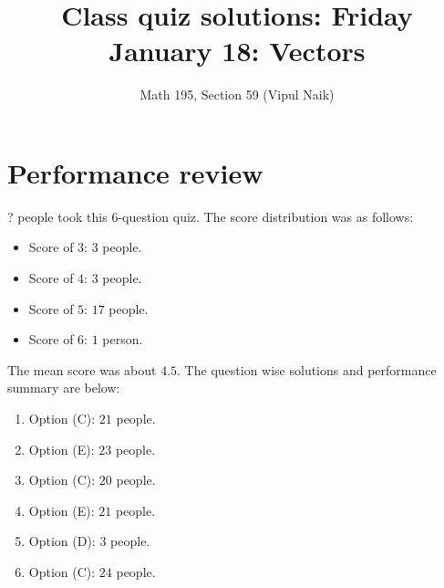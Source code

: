 \documentclass[10pt]{amsart}
\title{Class quiz solutions: Friday January 18: Vectors}
\author{Math 195, Section 59 (Vipul Naik)}
\begin{document}
\maketitle

\section{Performance review}

? people took this $6$-question quiz. The score distribution was as follows:

\begin{itemize}
\item Score of $3$: $3$ people.
\item Score of $4$: $3$ people.
\item Score of $5$: $17$ people.
\item Score of $6$: $1$ person.
\end{itemize}

The mean score was about $4.5$. The question wise solutions and
performance summary are below:

\begin{enumerate}
\item Option (C): $21$ people.
\item Option (E): $23$ people.
\item Option (C): $20$ people.
\item Option (E): $21$ people.
\item Option (D): $3$ people.
\item Option (C): $24$ people.
\end{enumerate}
\end{document}
